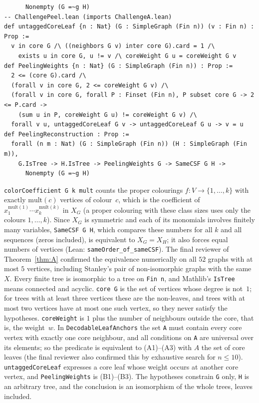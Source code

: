 \documentclass[11pt]{article}
\theoremstyle{definition}
\theoremstyle{remark}
\begin{document}
{{\begin{verbatim}
      Nonempty (G =~g H)
-- ChallengePeel.lean (imports ChallengeA.lean)
def untaggedCoreLeaf {n : Nat} (G : SimpleGraph (Fin n)) (v : Fin n) : Prop :=
  v in core G /\ ((neighbors G v) inter core G).card = 1 /\
    exists u in core G, u != v /\ coreWeight G u = coreWeight G v
def PeelingWeights {n : Nat} (G : SimpleGraph (Fin n)) : Prop :=
  2 <= (core G).card /\
  (forall v in core G, 2 <= coreWeight G v) /\
  (forall v in core G, forall P : Finset (Fin n), P subset core G -> 2 <= P.card ->
    (sum u in P, coreWeight G u) != coreWeight G v) /\
  forall v u, untaggedCoreLeaf G v -> untaggedCoreLeaf G u -> v = u
def PeelingReconstruction : Prop :=
  forall (n m : Nat) (G : SimpleGraph (Fin n)) (H : SimpleGraph (Fin m)),
    G.IsTree -> H.IsTree -> PeelingWeights G -> SameCSF G H ->
      Nonempty (G =~g H)
\end{verbatim}}

\noindent \texttt{colorCoefficient G k mult} counts the proper colourings
$f:V\to\{1,\dots,k\}$ with exactly $\mathrm{mult}(c)$ vertices of colour~$c$,
which is the coefficient of $x_1^{\mathrm{mult}(1)}\cdots x_k^{\mathrm{mult}(k)}$
in $X_G$ (a proper colouring with these class sizes uses only the colours
$1,\dots,k$). Since $X_G$ is symmetric and each of its monomials involves finitely
many variables, \texttt{SameCSF G H}, which compares these numbers for all $k$
and all sequences (zeros included), is equivalent to $X_G=X_H$; it also forces
equal numbers of vertices (Lean: \texttt{sameOrder\_of\_sameCSF}). The final
reviewer of Theorem~\ref{thm:A} confirmed the equivalence numerically on all
$52$ graphs with at most $5$ vertices, including Stanley's pair of
non-isomorphic graphs with the same~$X$. Every finite tree is isomorphic to a
tree on \texttt{Fin n}, and Mathlib's \texttt{IsTree} means connected and
acyclic. \texttt{core G} is the set of vertices whose degree is not~$1$; for
trees with at least three vertices these are the non-leaves, and trees with at
most two vertices have at most one such vertex, so they never satisfy the
hypotheses. \texttt{coreWeight} is $1$ plus the number of neighbours outside the
core, that is, the weight~$w$. In \texttt{DecodableLeafAnchors} the set
\texttt{A} must contain every core vertex with exactly one core neighbour, and
all conditions on \texttt{A} are universal over its elements; so the predicate is
equivalent to (A1)--(A3) with $A$ the set of core leaves (the final reviewer also
confirmed this by exhaustive search for $n\le10$). \texttt{untaggedCoreLeaf}
expresses a core leaf whose weight occurs at another core vertex, and
\texttt{PeelingWeights} is (B1)--(B3). The hypotheses constrain \texttt{G} only,
\texttt{H} is an arbitrary tree, and the conclusion is an isomorphism of the
whole trees, leaves included.

}
\end{document}

